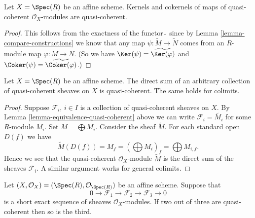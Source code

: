 \begin{lemma}
\label{lemma-kernel-cokernel-quasi-coherent}
Let $X = \Spec(R)$ be an affine scheme.
Kernels and cokernels of maps of quasi-coherent
$\mathcal{O}_X$-modules are quasi-coherent.
\end{lemma}

\begin{proof}
This follows from the exactness of the functor $\widetilde{\ }$
since by Lemma \ref{lemma-compare-constructions} we know that any map
$\psi : \widetilde{M} \to \widetilde{N}$ comes from
an $R$-module map $\varphi : M \to N$. (So we have
$\Ker(\psi) = \widetilde{\Ker(\varphi)}$ and
$\Coker(\psi) = \widetilde{\Coker(\varphi)}$.)
\end{proof}

\begin{lemma}
\label{lemma-colimit-quasi-coherent}
Let $X = \Spec(R)$ be an affine scheme.
The direct sum of an arbitrary collection of quasi-coherent sheaves
on $X$ is quasi-coherent. The same holds for colimits.
\end{lemma}

\begin{proof}
Suppose $\mathcal{F}_i$, $i \in I$ is a collection of quasi-coherent
sheaves on $X$. By Lemma \ref{lemma-equivalence-quasi-coherent}
above we can write $\mathcal{F}_i = \widetilde{M_i}$ for some $R$-module
$M_i$. Set $M = \bigoplus M_i$. Consider the sheaf $\widetilde{M}$.
For each standard open $D(f)$ we have
$$
\widetilde{M}(D(f)) = M_f =
\left(\bigoplus M_i\right)_f =
\bigoplus M_{i, f}.
$$
Hence we see that the quasi-coherent $\mathcal{O}_X$-module
$\widetilde{M}$ is the direct sum of the sheaves $\mathcal{F}_i$.
A similar argument works for general colimits.
\end{proof}

\begin{lemma}
\label{lemma-extension-quasi-coherent}
Let $(X, \mathcal{O}_X) = (\Spec(R), \mathcal{O}_{\Spec(R)})$
be an affine scheme. Suppose that
$$
0 \to
\mathcal{F}_1 \to
\mathcal{F}_2 \to
\mathcal{F}_3 \to
0
$$
is a short exact sequence of sheaves $\mathcal{O}_X$-modules.
If two out of three are quasi-coherent then so is the third.
\end{lemma}

